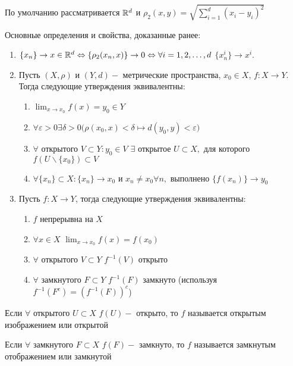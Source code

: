
По умолчанию рассматривается $\mathbb{R}^d$ и $\rho_2(x,y) = \sqrt{\sum_{i=1}^d(x_i - y_i)^2}$

\begin{remark}
	Основные определения и свойства, доказанные ранее:
		\begin{enumerate}
			\item	$\{x_n\} \to x \in \mathbb{R}^d \Leftrightarrow \{\rho_2(x_n, x)\} \to 0 \Leftrightarrow \forall i = 1, 2, \ldots , d$ $\{x_n^i \} \to x^i$.
			\item Пусть $(X, \rho)$ и $(Y, d) -$ метрические пространства, $x_0 \in X$, $f:X \to Y$. Тогда следующие утверждения эквивалентны:
				\begin{enumerate}
					\item $\lim_{x\to x_0} f(x) = y_0 \in Y$
					\item $\forall \varepsilon > 0 \exists \delta > 0 \Big(\rho(x_0, x) < \delta \mapsto d(y_0, y) < \varepsilon \Big)$
					\item $\forall$ открытого $V \subset Y : y_0 \in V$ $\exists $ открытое $U \subset X,$ для которого $f(U\backslash \{x_0\}) \subset V$
					\item $\forall \{x_n\} \subset X: \{x_n\}\to x_0\text{ и } x_n \neq x_0 \forall n,\text{ выполнено }\{f(x_n)\} \to y_0$
				\end{enumerate}
			\item Пусть $f : X \to Y$, тогда следующие утверждения эквивалентны:
				\begin{enumerate}
					\item $f$ непрерывна на $X$
					\item $\forall x \in X$ $\lim_{x \to x_0} f(x) = f(x_0)$
					\item $\forall$ открытого $V \subset Y$ $f^{-1}(V)$ открыто
					\item $\forall$ замкнутого $F \subset Y$ $f^{-1}(F)$ замкнуто (используя $f^{-1}(F^c) = (f^{-1}(F))^c$)
				\end{enumerate}
		\end{enumerate}
\end{remark}

\begin{definition}
	Если $\forall$ открытого $U \subset X$ $f(U) - $ открыто, то $f$ называется открытым изображением или открытой\\
\end{definition}

\begin{definition}
	Если $\forall$ замкнутого $F \subset X$ $f(F) - $ замкнуто, то $f$ называется замкнутым отображением или замкнутой\\
\end{definition}

